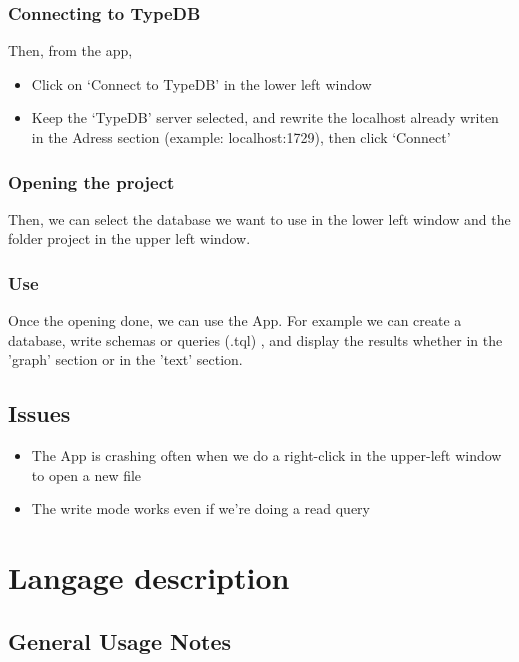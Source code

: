 \documentclass{article}
\begin{document}
\subsubsection{Connecting to TypeDB}
Then, from the app,
\begin{itemize}
\item Click on ‘Connect to TypeDB’ in the lower left window
\item Keep the ‘TypeDB’ server selected, and rewrite the localhost already writen in the Adress section (example: localhost:1729), then click ‘Connect’
\end{itemize}

\subsubsection{Opening the project}
Then, we can select the database we want to use in the lower left window and the folder project in the upper left window.

\subsubsection{Use}
    Once the opening done, we can use the App. For example we can create a database, write schemas or queries (.tql) , and display the results whether in the 'graph' section or in the 'text' section.
    






\subsection{Issues}


\begin{itemize}
\item The App is crashing often when we do a right-click in the upper-left window to open a new file
\item The write mode works even if we're doing a read query
\end{itemize}

\section{Langage description}

\subsection{General Usage Notes}
\end{document}
